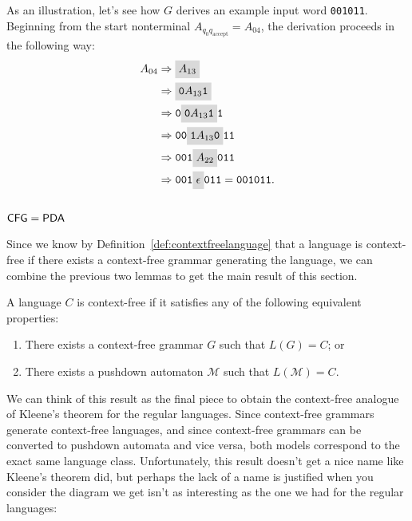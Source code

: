 \begin{example}
As an illustration, let's see how $G$ derives an example input word \texttt{001011}. Beginning from the start nonterminal $A_{q_{0}q_{\text{accept}}} = A_{04}$, the derivation proceeds in the following way:
\begin{align*}
A_{04} &\Rightarrow \highlightmath{A_{13}} \\
&\Rightarrow \highlightmath{\texttt{0}A_{13}\texttt{1}} \\
&\Rightarrow \texttt{0}\highlightmath{\texttt{0}A_{13}\texttt{1}}\texttt{1} \\
&\Rightarrow \texttt{00}\highlightmath{\texttt{1}A_{13}\texttt{0}}\texttt{11} \\
&\Rightarrow \texttt{001}\highlightmath{A_{22}}\texttt{011} \\
&\Rightarrow \texttt{001}\highlightmath{\epsilon}\texttt{011} = \texttt{001011}.
\end{align*}
\end{example}

\subsection{$\textsf{CFG} = \textsf{PDA}$}

Since we know by Definition~\ref{def:contextfreelanguage} that a language is context-free if there exists a context-free grammar generating the language, we can combine the previous two lemmas to get the main result of this section.

\begin{theorem}\label{thm:CFGPDAequivalence}
A language $C$ is context-free if it satisfies any of the following equivalent properties:
\begin{enumerate}
\item There exists a context-free grammar $G$ such that $L(G) = C$; or
\item There exists a pushdown automaton $\mathcal{M}$ such that $L(\mathcal{M}) = C$.
\end{enumerate}
\end{theorem}

We can think of this result as the final piece to obtain the context-free analogue of Kleene's theorem for the regular languages. Since context-free grammars generate context-free languages, and since context-free grammars can be converted to pushdown automata and vice versa, both models correspond to the exact same language class. Unfortunately, this result doesn't get a nice name like Kleene's theorem did, but perhaps the lack of a name is justified when you consider the diagram we get isn't as interesting as the one we had for the regular languages:

